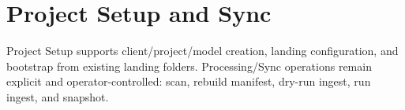 \section{Project Setup and Sync}
Project Setup supports client/project/model creation, landing configuration, and bootstrap from existing landing folders. Processing/Sync operations remain explicit and operator-controlled: scan, rebuild manifest, dry-run ingest, run ingest, and snapshot.

